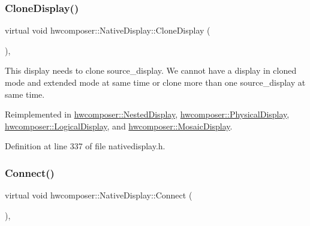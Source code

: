 \mbox{\label{classhwcomposer_1_1NativeDisplay_ad244fa57c9c6380fb04bfd57da3cb28b}} 
\subsubsection{\texorpdfstring{Clone\+Display()}{CloneDisplay()}}
{\footnotesize\ttfamily virtual void hwcomposer\+::\+Native\+Display\+::\+Clone\+Display (\begin{DoxyParamCaption}\item[{\mbox{\hyperlink{classhwcomposer_1_1NativeDisplay}{Native\+Display}} $\ast$}]{ }\end{DoxyParamCaption})\hspace{0.3cm}{\ttfamily [inline]}, {\ttfamily [virtual]}}

This display needs to clone source\+\_\+display. We cannot have a display in cloned mode and extended mode at same time or clone more than one source\+\_\+display at same time. 

Reimplemented in \mbox{\hyperlink{classhwcomposer_1_1NestedDisplay_a5dda0f532650e43eec782e81074563b3}{hwcomposer\+::\+Nested\+Display}}, \mbox{\hyperlink{classhwcomposer_1_1PhysicalDisplay_aca407c116394ab91581293e8a919cf78}{hwcomposer\+::\+Physical\+Display}}, \mbox{\hyperlink{classhwcomposer_1_1LogicalDisplay_a14d300f193051c5cd3e259bb0534401b}{hwcomposer\+::\+Logical\+Display}}, and \mbox{\hyperlink{classhwcomposer_1_1MosaicDisplay_a7944dd71d1efa68e0f94f68cc1bd30b2}{hwcomposer\+::\+Mosaic\+Display}}.



Definition at line 337 of file nativedisplay.\+h.


\begin{DoxyCode}{0}
\end{DoxyCode}
\mbox{\label{classhwcomposer_1_1NativeDisplay_a5c40ff028a9d547b1775b1c6f40df868}} 
\subsubsection{\texorpdfstring{Connect()}{Connect()}}
{\footnotesize\ttfamily virtual void hwcomposer\+::\+Native\+Display\+::\+Connect (\begin{DoxyParamCaption}{ }\end{DoxyParamCaption})\hspace{0.3cm}{\ttfamily [inline]}, {\ttfamily [virtual]}}

